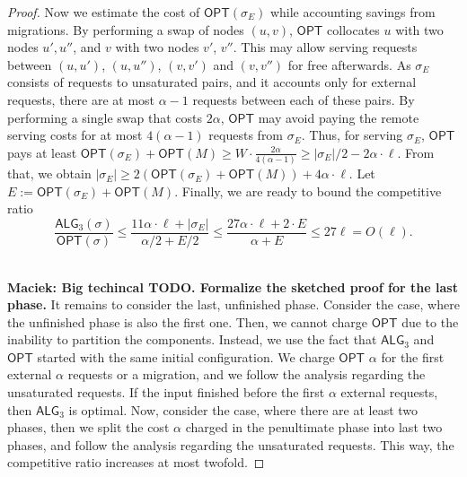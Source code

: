 \documentclass[manuscript,screen=true, review, anonymous]{acmart}
\newcommand{\OPT}{\textsf{OPT}\xspace}
\newcommand{\TAlg}{{\ensuremath{\textsf{ALG}_{3}}}\xspace}
\newcommand\maciek[1]{\color{brown}\textbf{\\ Maciek: #1}\color{black}}
\begin{document}
\begin{proof}
  Now we estimate the cost of $\OPT(\sigma_E)$ while accounting savings from migrations.
  By performing a swap of nodes $(u,v)$, $\OPT$ collocates $u$ with two nodes $u', u''$, and $v$ with two nodes $v'$, $v''$.
  This may allow serving requests between $(u,u')$, $(u,u'')$, $(v,v')$ and $(v,v'')$ for free afterwards.
  As $\sigma_E$ consists of requests to unsaturated pairs, and it accounts only for external requests, there are at most $\alpha-1$ requests between each of these pairs.
  By performing a single swap that costs $2\alpha$, $\OPT$ may avoid paying the remote serving costs for at most $4 (\alpha - 1)$ requests from $\sigma_E$.
  Thus, for serving $\sigma_E$, $\OPT$ pays at least $\OPT(\sigma_E) + \OPT(M) \geq W \cdot \frac{2\alpha}{4 (\alpha-1)}\geq |\sigma_E| / 2 - 2 \alpha \cdot \ell$.
  From that, we obtain $|\sigma_E| \geq 2(\OPT(\sigma_E)+\OPT(M)) + 4\alpha \cdot \ell$.
  Let $E := \OPT(\sigma_E) + \OPT(M)$. Finally, we are ready to bound the competitive ratio
  \begin{equation*}
    \frac{\TAlg(\sigma)}{\OPT(\sigma)} \leq \frac{11\alpha \cdot \ell + |\sigma_E|}{\alpha/2 + E/2} \leq \frac{27\alpha\cdot\ell + 2\cdot E}{\alpha + E} \leq 27 \ell = O(\ell).
  \end{equation*}

  \medskip

  \maciek{Big techincal TODO. Formalize the sketched proof for the last phase.}
  It remains to consider the last, unfinished phase.
  Consider the case, where the unfinished phase is also the first one.
  Then, we cannot charge $\OPT$ due to the inability to partition the components.
  Instead, we use the fact that \TAlg and $\OPT$ started with the same initial configuration.
  We charge $\OPT$ $\alpha$ for the first external $\alpha$ requests or a migration,
  and we follow the analysis regarding the unsaturated requests.
  If the input finished before the first $\alpha$ external requests, then \TAlg is optimal.
  Now, consider the case, where there are at least two phases, then we split the cost $\alpha$ charged in the penultimate phase into last two phases, and follow the analysis regarding the unsaturated requests.
  This way, the competitive ratio increases at most twofold.
\end{proof}



  

\pagebreak
\appendix
\end{document}
